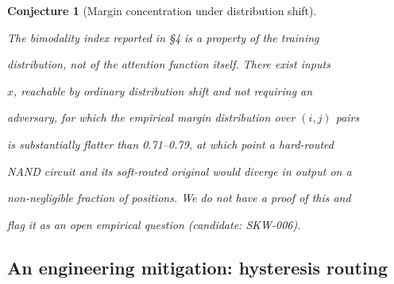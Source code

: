 \documentclass[11pt]{article}
\newtheorem{conjecture}[theorem]{Conjecture}
\theoremstyle{definition}
\begin{document}
\begin{conjecture}[Margin concentration under distribution shift]





\label{conj:shift-dup4}





The bimodality index reported in \S4 is a property of the training





distribution, not of the attention function itself. There exist inputs





$x$, reachable by ordinary distribution shift and not requiring an





adversary, for which the empirical margin distribution over $(i,j)$ pairs





is substantially flatter than 0.71--0.79, at which point a hard-routed





NAND circuit and its soft-routed original would diverge in output on a





non-negligible fraction of positions. We do not have a proof of this and





flag it as an open empirical question (candidate: SKW-006).





\end{conjecture}











\subsection{An engineering mitigation: hysteresis routing}
\end{document}
